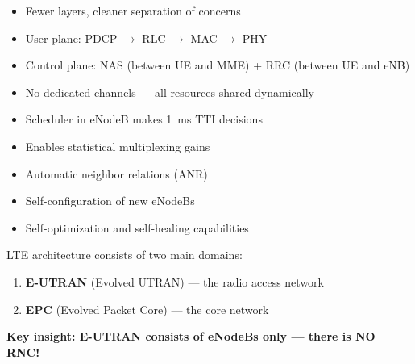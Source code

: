 
\begin{itemize}
\tightlist
\item
  Fewer layers, cleaner separation of concerns
\item
  User plane: PDCP \ensuremath{\to} RLC \ensuremath{\to} MAC \ensuremath{\to} PHY
\item
  Control plane: NAS (between UE and MME) + RRC (between UE and eNB)
\end{itemize}


\begin{itemize}
\tightlist
\item
  No dedicated channels — all resources shared dynamically
\item
  Scheduler in eNodeB makes 1~ms TTI decisions
\item
  Enables statistical multiplexing gains
\end{itemize}


\begin{itemize}
\tightlist
\item
  Automatic neighbor relations (ANR)
\item
  Self-configuration of new eNodeBs
\item
  Self-optimization and self-healing capabilities
\end{itemize}


LTE architecture consists of two main domains:

\begin{enumerate}
\def\labelenumi{\arabic{enumi}.}
\tightlist
\item
  \textbf{E-UTRAN} (Evolved UTRAN) — the radio access network
\item
  \textbf{EPC} (Evolved Packet Core) — the core network
\end{enumerate}



\begin{CNinsight}

\textbf{Key insight: E-UTRAN consists of eNodeBs only — there is NO RNC!}

\end{CNinsight}

